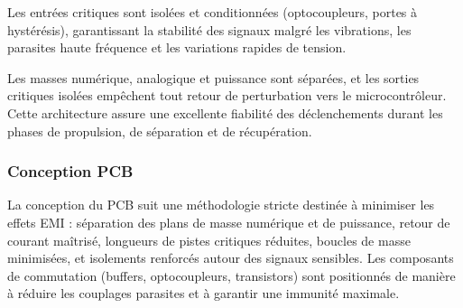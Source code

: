 Les entrées critiques sont isolées et conditionnées (optocoupleurs, portes à hystérésis), garantissant la stabilité des signaux
malgré les vibrations, les parasites haute fréquence et les variations rapides de tension.

Les masses numérique, analogique et puissance sont séparées, et les sorties critiques isolées empêchent tout retour de
perturbation vers le microcontrôleur. Cette architecture assure une excellente fiabilité des déclenchements durant les phases
de propulsion, de séparation et de récupération.

\subsubsection{Conception PCB}

La conception du PCB suit une méthodologie stricte destinée à minimiser les effets EMI : séparation des plans de masse numérique
et de puissance, retour de courant maîtrisé, longueurs de pistes critiques réduites, boucles de masse minimisées, et isolements
renforcés autour des signaux sensibles. Les composants de commutation (buffers, optocoupleurs, transistors) sont positionnés de
manière à réduire les couplages parasites et à garantir une immunité maximale.

\newpage
